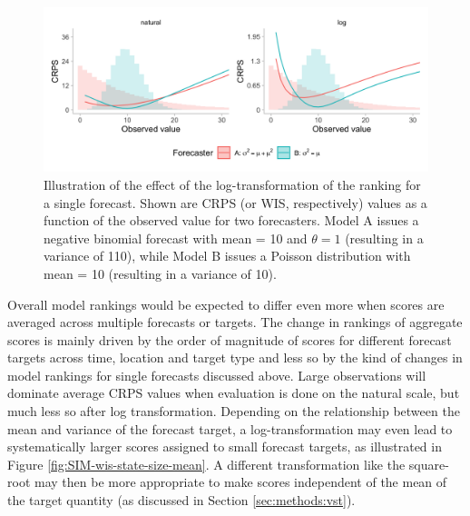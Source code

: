 \documentclass{article}
\begin{document}
\begin{figure}[h!]
\centering
\includegraphics[width = 1\textwidth]{output/figures/illustration-effect-log-ranking-crps.png}
\caption{Illustration of the effect of the log-transformation of the ranking for a single forecast. Shown are CRPS (or WIS, respectively) values as a function of the observed value for two forecasters. Model A issues a negative binomial forecast with mean = 10 and $\theta = 1$ (resulting in a variance of 110), while Model B issues a Poisson distribution with mean = 10 (resulting in a variance of 10).}
\label{fig:illustration-ranking}
\end{figure}

Overall model rankings would be expected to differ even more when scores are averaged across multiple forecasts or targets. The change in rankings of aggregate scores is mainly driven by the order of magnitude of scores for different forecast targets across time, location and target type and less so by the kind of changes in model rankings for single forecasts discussed above. Large observations will dominate average CRPS values when evaluation is done on the natural scale, but much less so after log transformation. Depending on the relationship between the mean and variance of the forecast target, a log-transformation may even lead to systematically larger scores assigned to small forecast targets, as illustrated in Figure \ref{fig:SIM-wis-state-size-mean}. A different transformation like the square-root may then be more appropriate to make scores independent of the mean of the target quantity (as discussed in Section \ref{sec:methods:vst}). 

\end{document}
